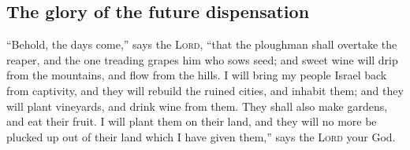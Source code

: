 \hypertarget{the-glory-of-the-future-dispensation}{%
\subsection{The glory of the future
dispensation}\label{the-glory-of-the-future-dispensation}}

 ``Behold, the days come,'' says the \textsc{Lord},
``that the ploughman shall overtake the reaper, and the one treading
grapes him who sows seed; and sweet wine will drip from the mountains,
and flow from the hills.  I will bring my people Israel
back from captivity, and they will rebuild the ruined cities, and
inhabit them; and they will plant vineyards, and drink wine from them.
They shall also make gardens, and eat their fruit.  I
will plant them on their land, and they will no more be plucked up out
of their land which I have given them,'' says the \textsc{Lord} your
God.
